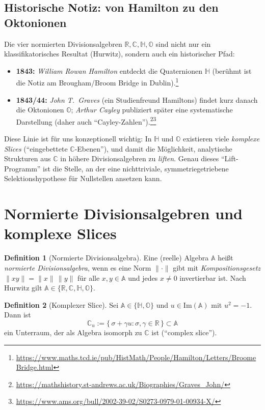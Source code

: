 \documentclass[11pt,a4paper]{article}
\theoremstyle{plain}
\theoremstyle{definition}
\newtheorem{definition}{Definition}
\theoremstyle{remark}
\newcommand{\C}{\mathbb{C}}
\newcommand{\R}{\mathbb{R}}
\newcommand{\Hh}{\mathbb{H}}
\newcommand{\Okt}{\mathbb{O}}
\begin{document}
\subsection*{Historische Notiz: von Hamilton zu den Oktonionen}
Die vier normierten Divisionsalgebren $\mathbb{R},\mathbb{C},\mathbb{H},\mathbb{O}$ sind nicht nur ein
klassifikatorisches Resultat (Hurwitz), sondern auch ein historischer Pfad:
\begin{itemize}
\item \textbf{1843:} \emph{William Rowan Hamilton} entdeckt die Quaternionen $\mathbb{H}$ (ber\"uhmt ist die Notiz
      am Brougham/Broom Bridge in Dublin).\footnote{\url{https://www.maths.tcd.ie/pub/HistMath/People/Hamilton/Letters/BroomeBridge.html}}
\item \textbf{1843/44:} \emph{John T.\ Graves} (ein Studienfreund Hamiltons) findet kurz danach die Oktonionen
      $\mathbb{O}$; \emph{Arthur Cayley} publiziert sp\"ater eine systematische Darstellung (daher auch ``Cayley-Zahlen'').\footnote{\url{https://mathshistory.st-andrews.ac.uk/Biographies/Graves_John/}}\footnote{\url{https://www.ams.org/bull/2002-39-02/S0273-0979-01-00934-X/}}
\end{itemize}

Diese Linie ist f\"ur uns konzeptionell wichtig: In $\mathbb{H}$ und $\mathbb{O}$ existieren viele
\emph{komplexe Slices} (``eingebettete $\mathbb{C}$-Ebenen''), und damit die M\"oglichkeit, analytische
Strukturen aus $\mathbb{C}$ in h\"ohere Divisionsalgebren zu \emph{liften}. Genau dieses ``Lift-Programm''
ist die Stelle, an der eine nichttriviale, symmetriegetriebene Selektionshypothese f\"ur Nullstellen ansetzen kann.

\section{Normierte Divisionsalgebren und komplexe Slices}

\begin{definition}[Normierte Divisionsalgebra]
Eine (reelle) Algebra $\mathbb{A}$ hei\ss t \emph{normierte Divisionsalgebra}, wenn es eine Norm
$\|\cdot\|$ gibt mit \emph{Kompositionsgesetz} $\|xy\|=\|x\|\,\|y\|$ f\"ur alle $x,y\in\mathbb{A}$
und jedes $x\neq 0$ invertierbar ist.
Nach Hurwitz gilt $\mathbb{A}\in\{\R,\C,\Hh,\Okt\}$.
\end{definition}

\begin{definition}[Komplexer Slice]
Sei $\mathbb{A}\in\{\Hh,\Okt\}$ und $u\in\mathrm{Im}(\mathbb{A})$ mit $u^2=-1$.
Dann ist
\[
\C_u := \{\,\sigma + \gamma u : \sigma,\gamma\in\R\,\}\subset\mathbb{A}
\]
ein Unterraum, der als Algebra isomorph zu $\C$ ist (``complex slice'').
\end{definition}
\end{document}
